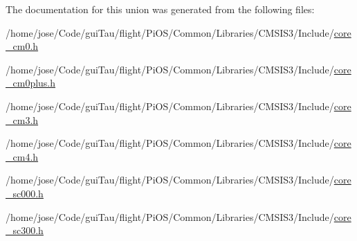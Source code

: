 The documentation for this union was generated from the following files\-:\begin{DoxyCompactItemize}
\item 
/home/jose/\-Code/gui\-Tau/flight/\-Pi\-O\-S/\-Common/\-Libraries/\-C\-M\-S\-I\-S3/\-Include/\hyperlink{core__cm0_8h}{core\-\_\-cm0.\-h}\item 
/home/jose/\-Code/gui\-Tau/flight/\-Pi\-O\-S/\-Common/\-Libraries/\-C\-M\-S\-I\-S3/\-Include/\hyperlink{core__cm0plus_8h}{core\-\_\-cm0plus.\-h}\item 
/home/jose/\-Code/gui\-Tau/flight/\-Pi\-O\-S/\-Common/\-Libraries/\-C\-M\-S\-I\-S3/\-Include/\hyperlink{_common_2_libraries_2_c_m_s_i_s3_2_include_2core__cm3_8h}{core\-\_\-cm3.\-h}\item 
/home/jose/\-Code/gui\-Tau/flight/\-Pi\-O\-S/\-Common/\-Libraries/\-C\-M\-S\-I\-S3/\-Include/\hyperlink{core__cm4_8h}{core\-\_\-cm4.\-h}\item 
/home/jose/\-Code/gui\-Tau/flight/\-Pi\-O\-S/\-Common/\-Libraries/\-C\-M\-S\-I\-S3/\-Include/\hyperlink{core__sc000_8h}{core\-\_\-sc000.\-h}\item 
/home/jose/\-Code/gui\-Tau/flight/\-Pi\-O\-S/\-Common/\-Libraries/\-C\-M\-S\-I\-S3/\-Include/\hyperlink{core__sc300_8h}{core\-\_\-sc300.\-h}\end{DoxyCompactItemize}

